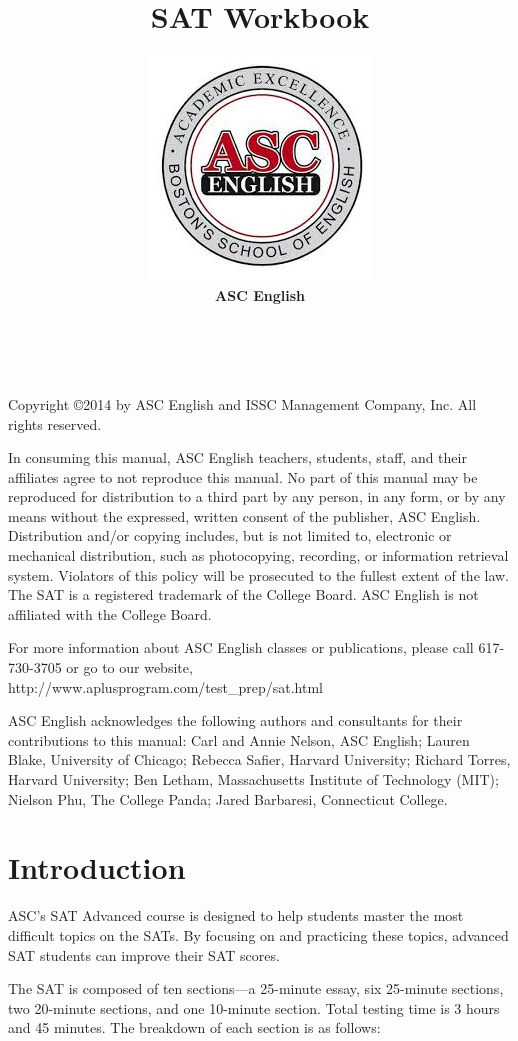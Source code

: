 \documentclass[12pt]{book}
\title{\textbf{\huge SAT Workbook}}
\author{\includegraphics{logo}\\\textbf{\large ASC English}}
\date{}
\begin{document}
\maketitle

\newpage
\

\vfill
\begingroup
\fontsize{10pt}{12pt}\selectfont
Copyright \copyright 2014 by ASC English and ISSC Management Company, Inc. All rights reserved.

\bigskip
In consuming this manual, ASC English teachers, students, staff, and their affiliates agree to not reproduce this manual. No part of this manual may be reproduced for distribution to a third part by any person, in any form, or by any means without the expressed, written consent of the publisher, ASC English. Distribution and/or copying includes, but is not limited to, electronic or mechanical distribution, such as photocopying, recording, or information retrieval system. Violators of this policy will be prosecuted to the fullest extent of the law.\\
 

\bigskip
The SAT is a registered trademark of the College Board. ASC English is not affiliated with the College Board. 


\bigskip
For more information about ASC English classes or publications, please call 617-730-3705 or go to our website, http:\//\//www.aplusprogram.com\//test\_prep\//sat.html

\bigskip
ASC English acknowledges the following authors and consultants for their contributions to this manual: Carl and Annie Nelson, ASC English; Lauren Blake, University of Chicago; Rebecca Safier, Harvard University; Richard Torres, Harvard University; Ben Letham, Massachusetts Institute of Technology (MIT); Nielson Phu, The College Panda; Jared Barbaresi, Connecticut College.  
\endgroup

\tableofcontents
\chapter{Introduction}

ASC's SAT Advanced course is designed to help students master the most difficult topics on the SATs. By focusing on and practicing these topics, advanced SAT students can improve their SAT scores.

\bigskip
The SAT is composed of ten sections—a 25-minute essay, six 25-minute sections, two 20-minute sections, and one 10-minute section. Total testing time is 3 hours and 45 minutes. The breakdown of each section is as follows:
\end{document}
